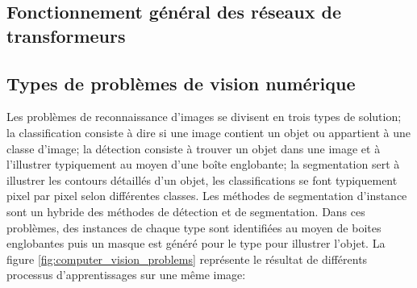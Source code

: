   \subsection{Fonctionnement général des réseaux de transformeurs}

  \subsection{Types de problèmes de vision numérique}
    Les problèmes de reconnaissance d'images se divisent en trois types de solution; la classification consiste à dire si une image contient un objet ou appartient à une classe d'image; la détection consiste à trouver un objet dans une image et à l'illustrer typiquement au moyen d'une boîte englobante; la segmentation sert à illustrer les contours détaillés d'un objet, les classifications se font typiquement pixel par pixel selon différentes classes. Les méthodes de segmentation d'instance sont un hybride des méthodes de détection et de segmentation. Dans ces problèmes, des instances de chaque type sont identifiées au moyen de boites englobantes puis un masque est généré pour le type pour illustrer l'objet. La figure \ref{fig:computer_vision_problems} représente le résultat de différents processus d'apprentissages sur une même image:

